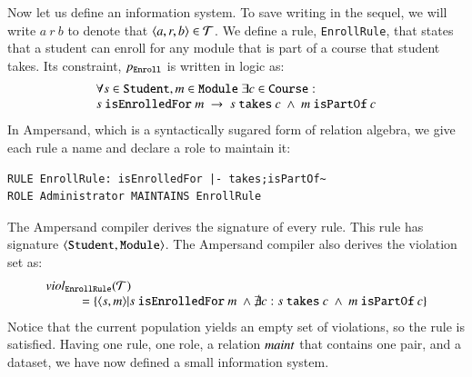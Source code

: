 \documentclass{elsarticle}
\begin{document}
   Now let us define an information system.
   To save writing in the sequel, we will write $a\ r\ b$ to denote that $\langle{a},{r},{b}\rangle\in\mathcal{T}$.
   We define a rule, {\tt EnrollRule}, that states that a student can enroll for any module that is part of a course that student takes.
   Its constraint, $p_{\tt Enroll}$ is written in logic as:
\[\begin{array}{l}\forall s\in\text{\tt Student}, m\in\text{\tt Module}\ \exists c\in\text{\tt Course}:\\
s\ \text{\tt isEnrolledFor}\ m\ \rightarrow\ s\ \text{\tt takes}\ c\ \wedge\ m\ \text{\tt isPartOf}\ c
\end{array}\]
   In Ampersand, which is a syntactically sugared form of relation algebra,
   we give each rule a name and declare a role to maintain it:
\begin{verbatim}
RULE EnrollRule: isEnrolledFor |- takes;isPartOf~
ROLE Administrator MAINTAINS EnrollRule
\end{verbatim}
   The Ampersand compiler derives the signature of every rule.
   This rule has signature $\langle{\text{\tt Student}},{\text{\tt Module}}\rangle$.
   The Ampersand compiler also derives the violation set as:
\[\begin{array}{l}
   \viol{\text{\tt EnrollRule}}{\triples}\\
   \hspace{1cm}=\{\pair{s}{m}|s\ \text{\tt isEnrolledFor}\ m\ \wedge\not\exists c: s\ \text{\tt takes}\ c\ \wedge\ m\ \text{\tt isPartOf}\ c\}
\end{array}\]
   Notice that the current population yields an empty set of violations,
   so the rule is satisfied.
   Having one rule, one role, a relation $\text{\it maint\/}$ that contains one pair, and a dataset,
   we have now defined a small information system.
\end{document}
